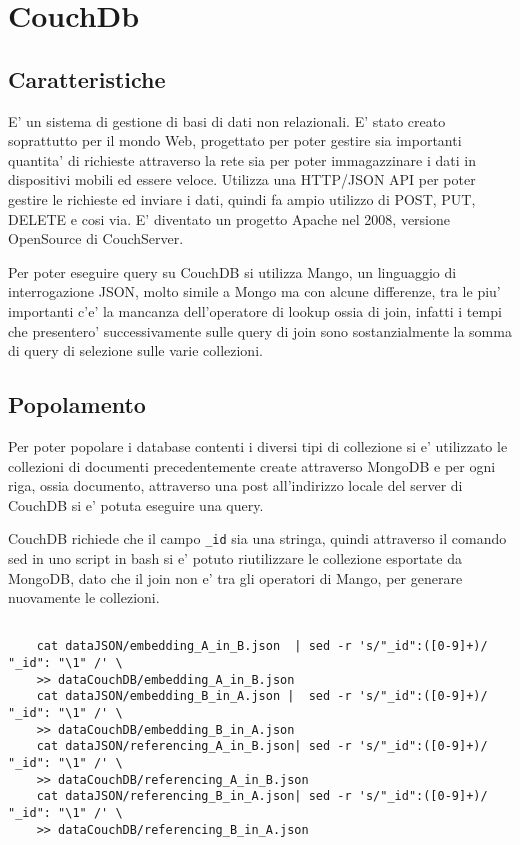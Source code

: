 \chapter{CouchDb}

\section{Caratteristiche}

E' un sistema di gestione di basi di dati non relazionali. E' stato creato soprattutto per il mondo Web, progettato per poter gestire sia importanti quantita' di richieste attraverso
la rete sia per poter immagazzinare i dati in dispositivi mobili ed essere veloce. Utilizza una HTTP/JSON API per poter gestire le richieste ed inviare i dati, quindi
fa ampio utilizzo di POST, PUT, DELETE e cosi via. E' diventato un progetto Apache nel 2008, versione OpenSource di CouchServer.

Per poter eseguire query su CouchDB si utilizza Mango, un linguaggio di interrogazione JSON, molto simile a Mongo ma con alcune differenze, tra le piu'
importanti c'e' la mancanza dell'operatore di lookup ossia di join, infatti i tempi che presentero' successivamente sulle query di join sono 
sostanzialmente la somma di query di selezione sulle varie collezioni.
\section{Popolamento}

Per poter popolare i database contenti i diversi tipi di collezione si e' utilizzato le collezioni di documenti precedentemente create attraverso MongoDB e per ogni 
riga, ossia documento, attraverso una post all'indirizzo locale del server di CouchDB si e' potuta eseguire una query.

CouchDB richiede che il campo \verb|_id| sia una stringa, quindi attraverso il comando sed in uno script in bash si e' potuto riutilizzare le collezione esportate
da MongoDB, dato che il join non e' tra gli operatori di Mango, per generare nuovamente le collezioni.

\begin{verbatim}

    cat dataJSON/embedding_A_in_B.json  | sed -r 's/"_id":([0-9]+)/ "_id": "\1" /' \ 
    >> dataCouchDB/embedding_A_in_B.json
    cat dataJSON/embedding_B_in_A.json |  sed -r 's/"_id":([0-9]+)/ "_id": "\1" /' \ 
    >> dataCouchDB/embedding_B_in_A.json
    cat dataJSON/referencing_A_in_B.json| sed -r 's/"_id":([0-9]+)/ "_id": "\1" /' \ 
    >> dataCouchDB/referencing_A_in_B.json
    cat dataJSON/referencing_B_in_A.json| sed -r 's/"_id":([0-9]+)/ "_id": "\1" /' \ 
    >> dataCouchDB/referencing_B_in_A.json

\end{verbatim}

